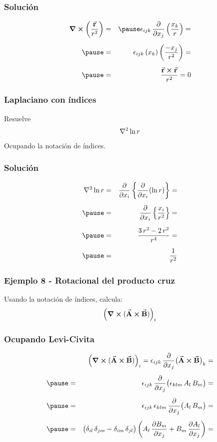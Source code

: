 \documentclass[12pt]{beamer}
\begin{document}
\begin{frame}
\frametitle{Solución}
\begin{eqnarray*}
\curl{\left( \dfrac{\va{r}}{r^{2}} \right)} &=& \pause \epsilon_{ijk} \, \pdv{x_{j}} \left( \dfrac{x_{k}}{r} \right) = \\[0.5em] \pause
&=& \epsilon_{ijk} \, (x_{k}) \left( \dfrac{-x_{j}}{r^{2}} \right) = \\[0.5em] \pause
&=& \dfrac{\va{r} \cp \va{r}}{r^{2}} = 0
\end{eqnarray*}
\end{frame}
\begin{frame}
\frametitle{Laplaciano con índices}
Resuelve
\begin{align*}
\laplacian{\ln r}
\end{align*}
Ocupando la notación de índices.
\end{frame}
\begin{frame}
\frametitle{Solución}
\begin{eqnarray*}
\laplacian{\ln r} &=& \pdv{x_{i}} \left\{ \pdv{x_{i}} (\ln r) \right\} = \\[0.5em] \pause
&=& \pdv{x_{i}} \left\{ \dfrac{x_{i}}{r^{2}} \right\} = \\[0.5em] \pause
&=& \dfrac{3 \, r^{2} - 2 \, r^{2}}{r^{4}} = \\[0.5em] \pause
&=& \dfrac{1}{r^{2}}
\end{eqnarray*}
\end{frame}
\begin{frame}
\frametitle{Ejemplo 8 - Rotacional del producto cruz}
Usando la notación de índices, calcula:
\begin{align*}
\left( \curl{(\va{A} \cp \va{B})} \right)_{i}
\end{align*}
\end{frame}
\begin{frame}
\frametitle{Ocupando Levi-Civita}
\begin{eqnarray*}
&{}& \! \left( \curl{(\va{A} \cp \va{B})} \right)_{i} = \epsilon_{ijk} \, \pdv{x_{j}} \big( \va{A} \cp \va{B} \big)_{k} = \\[0.5em] \pause
&=& \epsilon_{ijk} \, \pdv{x_{j}} \big( \epsilon_{klm} \, A_{l} \, B_{m} \big)= \\[0.5em] \pause
&=& \epsilon_{ijk} \, \epsilon_{klm} \, \pdv{x_{j}} \big( A_{l} \, B_{m} \big) = \\[0.5em] \pause
&=& \big( \delta_{il} \, \delta_{jm} - \delta_{im} \, \delta_{jl} \big) \left( A_{l} \, \pdv{B_{m}}{x_{j}} + B_{m} \, \pdv{A_{l}}{x_{j}} \right) =
\end{eqnarray*}
\end{frame}
\end{document}
